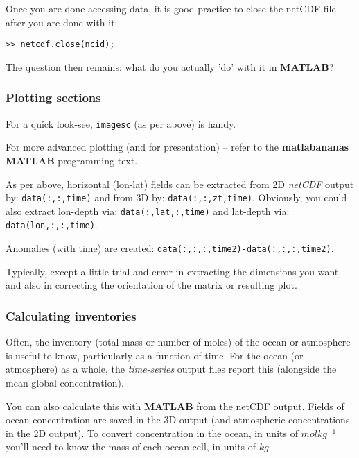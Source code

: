 \documentclass[11pt,fleqn]{book} %
\begin{document}
Once you are done accessing data, it is good practice to close the netCDF file after you are done with it:
\begin{verbatim}
>> netcdf.close(ncid);
\end{verbatim}

The question then remains: what do you actually 'do' with it in \textbf{MATLAB}?


\subsubsection{Plotting sections}

For a quick look-see, \texttt{imagesc} (as per above) is handy.

\noindent For more advanced plotting (and for presentation) -- refer to the \textbf{matlabananas} \textbf{MATLAB} programming text.

\noindent As per above, horizontal (lon-lat) fields can be extracted from 2D \textit{netCDF} output by: \texttt{data(:,:,time)} and from 3D by: \texttt{data(:,:,zt,time)}. Obviously, you could also extract lon-depth via: \texttt{data(:,lat,:,time)} and lat-depth via: \texttt{data(lon,:,:,time)}.

\noindent Anomalies (with time) are created: \texttt{data(:,:,:,time2)-data(:,:,:,time2)}.

Typically, except a little trial-and-error in extracting the dimensions you want, and also in correcting the orientation of the matrix or resulting plot.


\subsubsection{Calculating inventories}

Often, the inventory (total mass or number of moles) of the ocean or atmosphere is useful to know, particularly as a function of time. For the ocean (or atmosphere) as a whole, the \textit{time-series} output files report this (alongside the mean global concentration).

You can also calculate this with \textbf{MATLAB} from the netCDF output. Fields of ocean concentration are saved in the 3D output (and atmospheric concentrations in the 2D output). To convert concentration in the ocean, in units of \(molkg^{-1}\) you'll need to know the mass of each ocean cell, in units of \(kg\).
\end{document}
